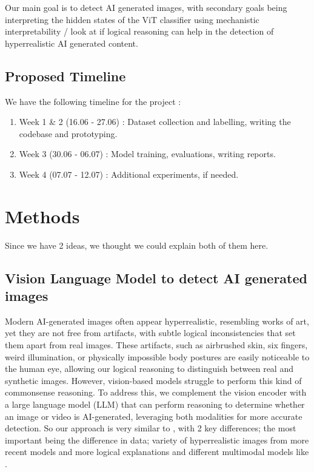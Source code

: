 \documentclass[10pt,twocolumn,letterpaper]{article}
\begin{document}
Our main goal is to detect AI generated images, with secondary goals being interpreting the hidden states of the ViT classifier using mechanistic interpretability / look at if logical reasoning can help in the detection of hyperrealistic AI generated content.

\subsection{Proposed Timeline}
We have the following timeline for the project :
\begin{enumerate}
	\item Week 1 \& 2 (16.06 - 27.06) : Dataset collection and labelling, writing the codebase and prototyping.
	\item Week 3 (30.06 - 06.07) : Model training, evaluations, writing reports.
	\item Week 4 (07.07 - 12.07) : Additional experiments, if needed.
\end{enumerate}

\section{Methods}
Since we have 2 ideas, we thought we could explain both of them here.

\subsection{Vision Language Model to detect AI generated images}
Modern AI-generated images often appear hyperrealistic, resembling works of art, yet they are not free from artifacts, with subtle logical inconsistencies that set them apart from real images. These artifacts, such as airbrushed skin, six fingers, weird illumination, or physically impossible body postures are easily noticeable to the human eye, allowing our logical reasoning to distinguish between real and synthetic images. However, vision-based models struggle to perform this kind of commonsense reasoning. To address this, we complement  the vision encoder with a large language model (LLM) that can perform reasoning to determine whether an image or video is AI-generated, leveraging both modalities for more accurate detection. So our approach is very similar to \cite{zhangCommonSenseReasoning2025}, with 2 key differences; the most important being the difference in data; variety of hyperrealistic images from more recent models and more logical explanations and different multimodal models like \cite{steiner2024paligemma2familyversatile, abdin2024phi3technicalreporthighly, chen2024far, chen2024internvl}. 
\end{document}
